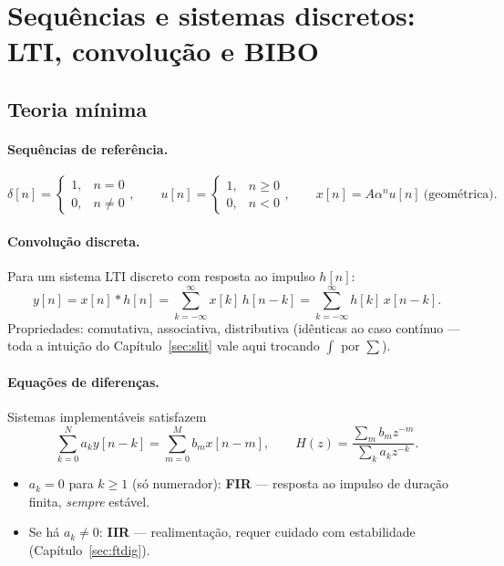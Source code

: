 \section{Sequências e sistemas discretos: LTI, convolução e BIBO}

\subsection*{Teoria mínima}

\paragraph{Sequências de referência.}
\[
  \delta[n]=
  \begin{cases}1,&n=0\\0,&n\neq0\end{cases},\qquad
  u[n]=
  \begin{cases}1,&n\ge0\\0,&n<0\end{cases},\qquad
  x[n]=A\alpha^n u[n]\ \text{(geométrica)}.
\]

\paragraph{Convolução discreta.} Para um sistema LTI discreto com resposta ao
impulso $h[n]$:
\[
  y[n]=x[n]*h[n]=\sum_{k=-\infty}^{\infty}x[k]\,h[n-k]
      =\sum_{k=-\infty}^{\infty}h[k]\,x[n-k].
\]
Propriedades: comutativa, associativa, distributiva (idênticas ao caso
contínuo — toda a intuição do Capítulo~\ref{sec:slit} vale aqui trocando
$\int$ por $\sum$).

\paragraph{Equações de diferenças.} Sistemas implementáveis satisfazem
\[
  \sum_{k=0}^{N}a_ky[n-k]=\sum_{m=0}^{M}b_mx[n-m],
  \qquad H(z)=\frac{\sum_m b_mz^{-m}}{\sum_k a_kz^{-k}} .
\]
\begin{itemize}
  \item $a_k=0$ para $k\ge1$ (só numerador): \textbf{FIR} --- resposta ao
        impulso de duração finita, \emph{sempre} estável.
  \item Se há $a_k\neq0$: \textbf{IIR} --- realimentação, requer cuidado com
        estabilidade (Capítulo~\ref{sec:ftdig}).
\end{itemize}

